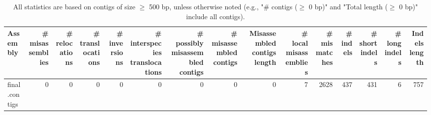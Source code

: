 \documentclass[12pt,a4paper]{article}
\begin{document}
\begin{table}[ht]
\begin{center}
\caption{All statistics are based on contigs of size $\geq$ 500 bp, unless otherwise noted (e.g., "\# contigs ($\geq$ 0 bp)" and "Total length ($\geq$ 0 bp)" include all contigs).}
\begin{tabular}{|l*{14}{|r}|}
\hline
Assembly & \# misassemblies &     \# relocations &     \# translocations &     \# inversions &     \# interspecies translocations & \# possibly misassembled contigs & \# misassembled contigs & Misassembled contigs length & \# local misassemblies & \# mismatches & \# indels &     \# short indels &     \# long indels & Indels length \\ \hline
final.contigs & 0 & 0 & 0 & 0 & 0 & 0 & 0 & 0 & 7 & 2628 & 437 & 431 & 6 & 757 \\ \hline
\end{tabular}
\end{center}
\end{table}
\end{document}
